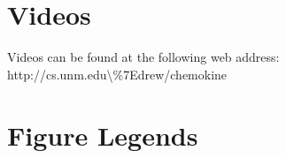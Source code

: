 \documentclass[10pt]{article}
\newcommand{\removed}[1]{{\color{dkred}\sout{#1}}}
\newcommand{\drew}[1]{{\color{dkgreen}#1}}
\newcommand{\fred}[1]{{\color{dkblue}#1}}
\begin{document}
%


\section*{Videos}

Videos can be found at the following web address: http://cs.unm.edu\textbackslash\%7Edrew/chemokine



\pagebreak

\section*{Figure Legends}



\setcounter{figure}{0}
\renewcommand{\thefigure}{S\arabic{figure}}
\end{document}
